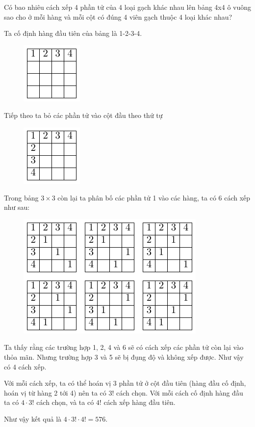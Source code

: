 \begin{problem}{4}
    Có bao nhiêu cách xếp 4 phần tử của 4 loại gạch khác nhau lên 
    bảng 4x4 ô vuông sao cho ở mỗi hàng và mỗi cột có đúng 4 viên 
    gạch thuộc 4 loại khác nhau?
\end{problem}

\begin{solution}
    Ta cố định hàng đầu tiên của bảng là 1-2-3-4.
    \begin{figure}[ht]
        \centering
        \includegraphics{Olympiad/InternetMaths/pic1.pdf}
    \end{figure}

    Tiếp theo ta bỏ các phần tử vào cột đầu theo thứ tự
    \begin{figure}[ht]
        \centering
        \includegraphics{Olympiad/InternetMaths/pic2.pdf}
    \end{figure}

    Trong bảng $3 \times 3$ còn lại ta phân bố các phần tử 1
    vào các hàng, ta có 6 cách xếp như sau:
    \begin{figure}
        \centering
        \includegraphics{Olympiad/InternetMaths/pic3.pdf}
    \end{figure}

    Ta thấy rằng các trường hợp 1, 2, 4 và 6 sẽ có cách xếp các
    phần tử còn lại vào thỏa mãn. Nhưng trường hợp 3 và 5 sẽ
    bị đụng độ và không xếp được. Như vậy có 4 cách xếp.

    Với mỗi cách xếp, ta có thể hoán vị 3 phần tử ở cột đầu tiên
    (hàng đầu cố định, hoán vị từ hàng 2 tới 4) nên ta có $3!$ 
    cách chọn. Với mỗi cách cố định hàng đầu ta có $4 \cdot 3!$
    cách chọn, và ta có $4!$ cách xếp hàng đầu tiên.

    Như vậy kết quả là $4 \cdot 3! \cdot 4! = 576$.

\end{solution}


